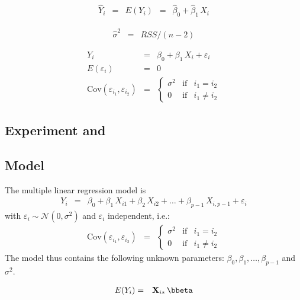 \documentclass[a4paper]{article}
\theoremstyle{myexamplestyle}
\begin{document}
\begin{eqnarray*}
\hat{Y}_i & = & E(Y_i) \, \, \, = \, \, \, \hat{\beta}_0 + \hat{\beta}_1 \, X_{i}
\end{eqnarray*}


\begin{eqnarray*}
\hat{\sigma}^2 & = & RSS / (n-2)
\end{eqnarray*}


\begin{eqnarray*}
Y_i & = & \beta_0 + \beta_1 \, X_{i} + \varepsilon_i
\\
E(\varepsilon_i) & = & 0
\\
\mbox{Cov}(\varepsilon_{i_1}, \varepsilon_{i_2}) & = &
\left\{
\begin{array}{ccc}
\sigma^2 & \mbox{if} & i_1 = i_2
\\
0 & \mbox{if} & i_1 \not= i_2
\end{array}
\right.
\end{eqnarray*}


\subsection{Experiment and }

\subsection{Model}
The multiple linear regression model is 
\begin{eqnarray*}
Y_i & = & \beta_0 + \beta_1 \, X_{i1}  + \beta_2 \, X_{i2} + \ldots  + \beta_{p-1} \, X_{i, p-1} + \varepsilon_i
\end{eqnarray*}
with $\varepsilon_i \sim \mathcal{N}(0, \sigma^2)$ and $\varepsilon_{i}$ independent, i.e.:
\begin{eqnarray*}
\mbox{Cov}(\varepsilon_{i_1}, \varepsilon_{i_2}) & = &
\left\{
\begin{array}{ccc}
\sigma^2 & \mbox{if} & i_1 = i_2
\\
0 & \mbox{if} & i_1 \not= i_2
\end{array}
\right.
\end{eqnarray*}
The model thus contains the following unknown parameters: $\beta_0, \beta_1, \ldots, \beta_{p-1}$ and $\sigma^2$.


\begin{eqnarray*}
E(Y_i) & = & \mathbf{X}_{i\ast} \, \bbeta
\end{eqnarray*}
\end{document}
